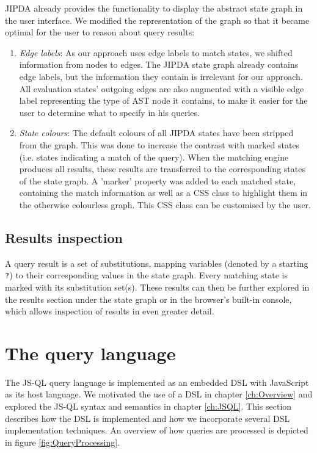 JIPDA already provides the functionality to display the abstract state graph in the user interface. We modified the representation of the graph so that it became optimal for the user to reason about query results:
\begin{enumerate}
\item \textit{Edge labels}: As our approach uses edge labels to match states, we shifted information from nodes to edges. The JIPDA state graph already contains edge labels, but the information they contain is irrelevant for our approach. All evaluation states' outgoing edges are also augmented with a visible edge label representing the type of AST node it contains, to make it easier for the user to determine what to specify in his queries.
\item \textit{State colours}: The default colours of all JIPDA states have been stripped from the graph. This was done to increase the contrast with marked states (i.e. states indicating a match of the query). When the matching engine produces all results, these results are transferred to the corresponding states of the state graph. A 'marker' property was added to each matched state, containing the match information as well as a CSS class to highlight them in the otherwise colourless graph. This CSS class can be customised by the user.
\end{enumerate}

\subsection*{Results inspection}

A query result is a set of substitutions, mapping variables (denoted by a starting \texttt{?}) to their corresponding values in the state graph. Every matching state is marked with its substitution set(s). These results can then be further explored in the results section under the state graph or in the browser's built-in console, which allows inspection of results in even greater detail.


\section{The query language}
\label{sec:queryLanguageImpl}
The JS-QL query language is implemented as an embedded DSL with JavaScript as its host language. We motivated the use of a DSL in chapter \ref{ch:Overview} and explored the JS-QL syntax and semantics in chapter \ref{ch:JSQL}. This section describes how the DSL is implemented and how we incorporate several DSL implementation techniques. An overview of how queries are processed is depicted in figure \ref{fig:QueryProcessing}.

